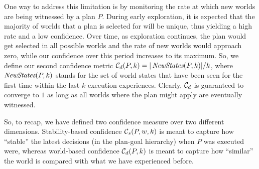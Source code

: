 \newcommand{\neww}{\mathname{NewStates}}
One way to address this limitation is by monitoring the rate at which new worlds are being witnessed by a  plan $P$. During early exploration, it is expected that the majority of worlds that a plan is selected for will be unique, thus yielding a high rate and a low confidence. Over time, as exploration continues, the plan would get selected in all possible worlds and the rate of new worlds would approach zero, while our confidence over this period increases to its maximum.  
So, we define our second confidence metric $\C_d(P,k) = |\neww(P,k)|/k$, where $\neww(P,k)$ stands for the set of world states that have been seen for the first time within the last $k$ execution experiences.   
Clearly, ${\mathcal{C}}_d$ is guaranteed to converge to $1$ as long as all worlds where the plan might apply are eventually witnessed.

% 


% 

So, to recap, we have defined two confidence measure over two different dimensions. Stability-based  confidence ${\mathcal{C}}_s(P,w,k)$ is meant to capture how ``stable'' the latest decisions (in the plan-goal hierarchy) when $P$ was executed were, whereas world-based confidence ${\mathcal{C}}_d(P,k)$ is meant to capture how ``similar'' the world is compared with what we have experienced before.


